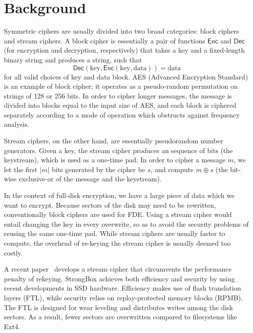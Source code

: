 \documentclass[11pt,twocolumn]{article}
\newcommand\Enc{\mathsf{Enc}}
\newcommand\Dec{\mathsf{Dec}}
\begin{document}
\section*{Background}

Symmetric ciphers are usually divided into two broad categories: block ciphers and stream ciphers.
A block cipher is essentially a pair of functions $\Enc$ and $\Dec$
(for encryption and decryption, respectively)
that takes a key and a fixed-length binary string
and produces a string,
such that
\begin{equation*}
    \Dec(\mathrm{key}, \Enc(\mathrm{key}, \mathrm{data})) = \mathrm{data}
\end{equation*}
for all valid choices of key and data block.
AES (Advanced Encryption Standard) is an example of block cipher;
it operates as a pseudo-random permutation on strings of 128 or 256 bits.
In order to cipher longer messages,
the message is divided into blocks equal to the input size of AES, and each block is ciphered separately according to a mode of operation which obstructs against frequency analysis.

Stream ciphers, on the other hand,
are essentially pseudorandom number generators.
Given a key,
the stream cipher produces an sequence of bits
(the keystream), which is used as a one-time pad.
In order to cipher a message $m$,
we let the first $|m|$ bits generated by the cipher be $s$,
and compute $m \oplus s$
(the bit-wise exclusive-or of the message and the keystream).

In the context of full-disk encryption,
we have a large piece of data which we want to encrypt.
Because sectors of the disk may need to be rewritten,
conventionally block ciphers are used for FDE.
Using a stream cipher would entail changing the key in every overwrite,
so as to avoid the security problems of reusing the same one-time pad.
While stream ciphers are usually faster to compute,
the overhead of re-keying the stream cipher is usually deemed too costly.

A recent paper~\cite{StrongBox2018} develops a stream cipher
that circumvents the performance penalty of rekeying.
StrongBox achieves both efficiency and security by using recent developments in SSD hardware.
Efficiency makes use of flash translation layers (FTL),
while security relies on replay-protected memory blocks (RPMB).
The FTL is designed for wear leveling and distributes writes among the disk sectors.
As a result, fewer sectors are overwritten compared to filesystems like Ext4.
\end{document}
